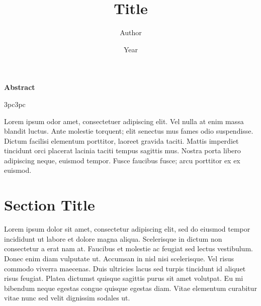 \documentclass[10pt,letterpaper,twocolumn]{article}
\begin{document}
\title{\textbf{Title}}
\author[1]{Author}
\date{\fontsize{10}{10}\selectfont Year}

\begin{titlepage}
  \maketitle
  \thispagestyle{empty}
\end{titlepage}

\fancyhead[C]{\nouppercase{\leftmark}}
\setcounter{page}{1}
\cfoot{\thepage}

\begin{strip}
  \begin{center}
    \textbf{Abstract}
  \end{center}
  \begin{changemargin}{3pc}{3pc}
    \begin{centering}
      \hspace{1pc} Lorem ipsum odor amet, consectetuer adipiscing elit. Vel nulla at enim massa blandit luctus. Ante molestie torquent; elit senectus mus fames odio suspendisse. Dictum facilisi elementum porttitor, laoreet gravida taciti. Mattis imperdiet tincidunt orci placerat lacinia taciti tempus sagittis mus. Nostra porta libero adipiscing neque, euismod tempor. Fusce faucibus fusce; arcu porttitor ex ex euismod.
    \end{centering}
  \end{changemargin}
\end{strip}

\section{Section Title}
\setcounter{equation}{0}

Lorem ipsum dolor sit amet, consectetur adipiscing elit, sed do eiusmod tempor incididunt ut labore et dolore magna aliqua. Scelerisque in dictum non consectetur a erat nam at. Faucibus et molestie ac feugiat sed lectus vestibulum. Donec enim diam vulputate ut. Accumsan in nisl nisi scelerisque. Vel risus commodo viverra maecenas. Duis ultricies lacus sed turpis tincidunt id aliquet risus feugiat. Platea dictumst quisque sagittis purus sit amet volutpat. Eu mi bibendum neque egestas congue quisque egestas diam. Vitae elementum curabitur vitae nunc sed velit dignissim sodales ut.\autocite[Lorem ipsum...]{latex-template}
\end{document}
